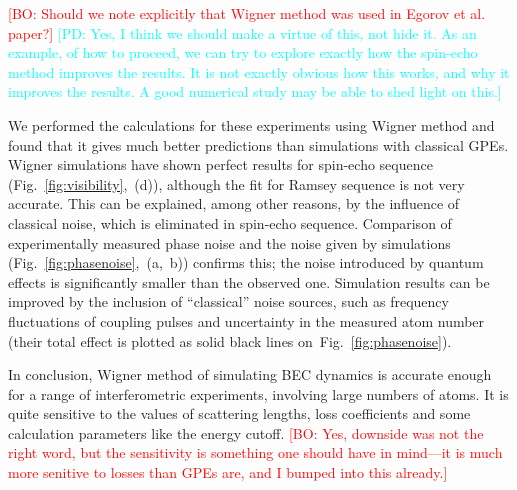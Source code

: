 \documentclass[aps,prl,twocolumn,showpacs,amsmath,amssymb,superscriptaddress]{revtex4-1}
\newcommand{\bogdansremark}[1]{\textcolor{red}{{[}BO: #1{]}}}
\newcommand{\petersremark}[1]{\textcolor{cyan}{{[}PD: #1{]}}}
\newcommand{\figref}[1]{Fig.~\ref{#1}}
\begin{document}
	\bogdansremark{Should we note explicitly that Wigner method was used in Egorov et al. paper?}
	\petersremark{Yes, I think we should make a virtue of this, not hide it.
	As an example, of how to proceed, we can try to explore exactly
	how the spin-echo method improves the results.
	It is not exactly obvious how this works, and why it improves the results.
	A good numerical study may be able to shed light on this.}

We performed the calculations for these experiments using Wigner method and found that
it gives much better predictions than simulations with classical GPEs.
Wigner simulations have shown perfect results for spin-echo sequence (\figref{fig:visibility},~(d)),
although the fit for Ramsey sequence is not very accurate.
This can be explained, among other reasons, by the influence of classical noise,
which is eliminated in spin-echo sequence.
Comparison of experimentally measured phase noise and the noise given by simulations
(\figref{fig:phasenoise},~(a,~b)) confirms this;
the noise introduced by quantum effects is significantly smaller than the observed one.
Simulation results can be improved by the inclusion of ``classical'' noise sources,
such as frequency fluctuations of coupling pulses and uncertainty in the measured atom number
(their total effect is plotted as solid black lines on~\figref{fig:phasenoise}).

In conclusion, Wigner method of simulating BEC dynamics
is accurate enough for a range of interferometric experiments,
involving large numbers of atoms.
It is quite sensitive to the values of scattering lengths,
loss coefficients and some calculation parameters like the energy cutoff.
	\bogdansremark{Yes, downside was not the right word,
	but the sensitivity is something one should have in mind---it is much more senitive to losses
	than GPEs are, and I bumped into this already.}


\end{document}
